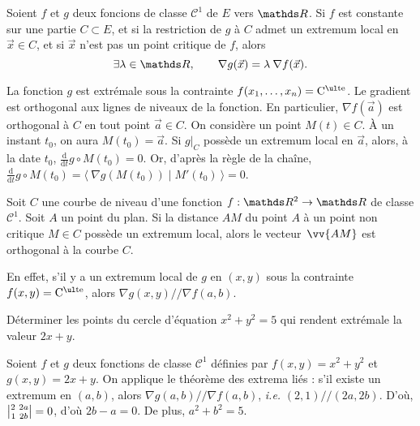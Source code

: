 \begin{prop}
	Soient $f$ et $g$ deux foncions de classe $\mathcal{C}^1$ de $E$ vers $\R$. Si $f$ est constante sur une partie $C \subset E$, et si la restriction de $g$ à $C$ admet un extremum local en $\vec{x} \in C$, et si $\vec{x}$ n'est pas un point critique de $f$, alors \[
		\exists \lambda \in \R,\quad\quad \nabla g(\vec{x}) = \lambda\:\nabla f(\vec{x})
	.\] 
\end{prop}

\begin{prv}
	La fonction $g$ est extrémale sous la contrainte $f(x_1, \ldots, x_n) = \Cte$.
	Le gradient est orthogonal aux lignes de niveaux de la fonction.
	En particulier, $\nabla f(\vec{a})$ est orthogonal à $C$ en tout point $\vec{a} \in C$.
	On considère un point $M(t) \in C$.
	À un instant $t_0$, on aura $M(t_0) = \vec{a}$.
	Si $g\big|_C$ possède un extremum local en $\vec{a}$, alors, à la date $t_0$, $\frac{\mathrm{d}}{\mathrm{d}t} g \circ M(t_0) = 0$.
	Or, d'après la règle de la chaîne, $\frac{\mathrm{d}}{\mathrm{d}t} g \circ M (t_0) = \langle \:\nabla g(M(t_0))  \mid M'(t_0)\:\rangle = 0$.
\end{prv}

\begin{exm}
	Soit $C$ une courbe de niveau d'une fonction $f : \R^2 \to \R$ de classe $\mathcal{C}^1$. Soit $A$ un point du plan. Si la distance $AM$ du point $A$ à un point non critique $M \in C$ possède un extremum local, alors le vecteur~$\vv{AM}$ est orthogonal à la courbe $C$.

	En effet, s'il y a un extremum local de $g$ en $(x,y)$ sous la contrainte $f(x,y) = \Cte$, alors $\nabla g(x,y) \mathbin{/\!/} \nabla f(a,b)$.
\end{exm}

\begin{exo}
	\begin{slshape}
		Déterminer les points du cercle d'équation $x^2 + y^2 = 5$ qui rendent extrémale la valeur $2x + y$.
	\end{slshape}

	Soient $f$ et $g$ deux fonctions de classe $\mathcal{C}^1$ définies par $f(x,y) = x^2 + y^2$ et $g(x,y) = 2x + y$.
	On applique le théorème des extrema liés : s'il existe un extremum en $(a,b)$, alors $\nabla g(a,b) \mathbin{/\!/} \nabla f(a,b)$, \textit{i.e.} $(2,1) \mathbin{/\!/} (2a,2b)$.
	D'où, ${2\ 2a\atopwithdelims||1\ 2b} = 0$, d'où $2b - a = 0$.
	De plus, $a^2 + b^2 = 5$.
\end{exo}


